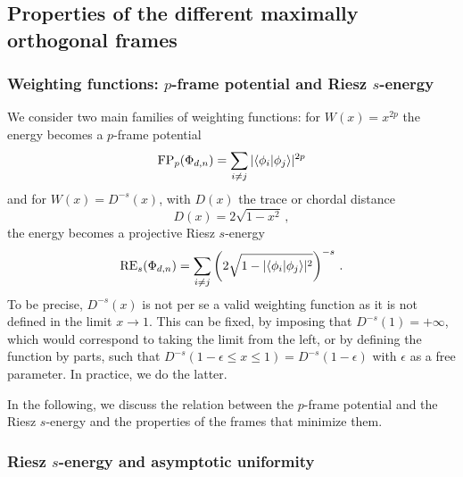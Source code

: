 \documentclass[%
superscriptaddress,
amsmath,amssymb,
 aps,
pra,
floatfix,
]{revtex4-2}
\begin{document}
\subsection{Properties of the different maximally orthogonal frames}
\label{subsec:properties_MOF}
\subsubsection{Weighting functions: $p$-frame potential and Riesz $s$-energy}

We consider two main families of weighting functions: for $W(x) = x^{2p}$ the energy becomes a $p$-frame potential \cite{renes2004symmetric, bilyk2021optimal, chen2020on}
%
\begin{equation}
    {\rm FP}_p(\Phi_{d, n}) = \sum_{i\neq j} |\langle\phi_i  |\phi_j \rangle|^{2p} 
    \label{eq:framepotential}
\end{equation}
%
and for $W(x) = D^{-s}(x)$, with $D(x)$ the trace or chordal distance 
%
\begin{equation}
    D(x) = 2 \sqrt{1 - x^2} \,,
    \label{eq:tracedistance}
\end{equation}
%
the energy becomes a projective Riesz $s$-energy \cite{chen2020on, foundations}
%
\begin{equation}
    {\rm RE}_{s} (\Phi_{d, n}) = \sum_{i \neq j} \left(2 \sqrt{1 - |\langle \phi_i | \phi_j \rangle|^2}\right)^{-s} \,.
    \label{eq:Rieszenergy}
\end{equation}
%
To be precise, $D^{-s}(x)$ is not per se a valid weighting function as it is not defined in the limit $x \to 1$. This can be fixed, by imposing that $D^{-s}(1) = +\infty$, which would correspond to taking the limit from the left, or by defining the function by parts, such that $D^{-s}(1-\epsilon \leq x \leq 1) = D^{-s}(1 - \epsilon)$ with $\epsilon$ as a free parameter.
In practice, we do the latter.

In the following, we discuss the relation between the $p$-frame potential and the Riesz $s$-energy and the properties of the frames that minimize them.

\subsubsection{Riesz $s$-energy and asymptotic uniformity}
\label{uniformity}
\end{document}

